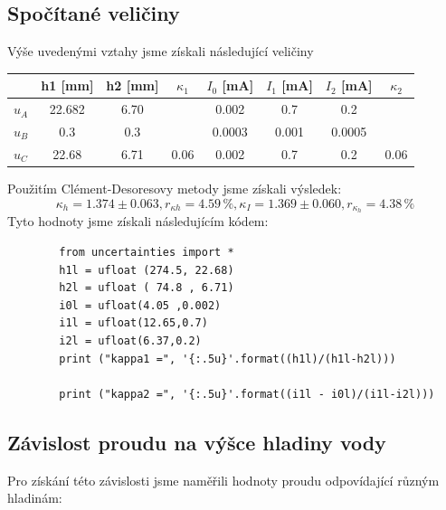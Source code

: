\documentclass[czech,11pt,a4paper]{article}
\begin{document}
	\subsection{Spočítané veličiny}
	Výše uvedenými vztahy jsme získali následující veličiny 
	\begin{center}
		\begin{tabular}{|l|c|c|c||c|c|c|c|}
		\hline
		& h1 [mm] & h2 [mm] & $\kappa _1$  & $I_0$ [mA] & $I_1$ [mA] & $I_2$ [mA] & $\kappa_2$    \\ \hline
		$u_A$ & 22.682              & 6.70                &         & 0.002               & 0.7   & 0.2 &           \\ \hline
		$u_B$ & 0.3                 & 0.3                 &         & 0.0003              & 0.001  & 0.0005         &  \\ \hline
		$u_C$ & 22.68               & 6.71                & 0.06    & 0.002               & 0.7 & 0.2 & 0.06      \\ \hline
	\end{tabular}
	\end{center}
	
	Použitím Clément-Desoresovy metody jsme získali výsledek:
	\begin{equation}
		\kappa_h = 1.374 \pm 0.063, r_{\kappa h} = 4.59 \, \% , \kappa_I = 1.369 \pm 0.060, r_{\kappa_h} = 4.38 \, \%
	\end{equation}
	Tyto hodnoty jsme získali následujícím kódem:
	\begin{verbatim}
		from uncertainties import *
		h1l = ufloat (274.5, 22.68)
		h2l = ufloat ( 74.8 , 6.71)
		i0l = ufloat(4.05 ,0.002)
		i1l = ufloat(12.65,0.7)
		i2l = ufloat(6.37,0.2)
		print ("kappa1 =", '{:.5u}'.format((h1l)/(h1l-h2l)))
		
		print ("kappa2 =", '{:.5u}'.format((i1l - i0l)/(i1l-i2l)))
	\end{verbatim}
	
	
	\subsection{Závislost proudu na výšce hladiny vody}
	Pro získání této závislosti jsme naměřili hodnoty proudu odpovídající různým hladinám:
	
\end{document}
